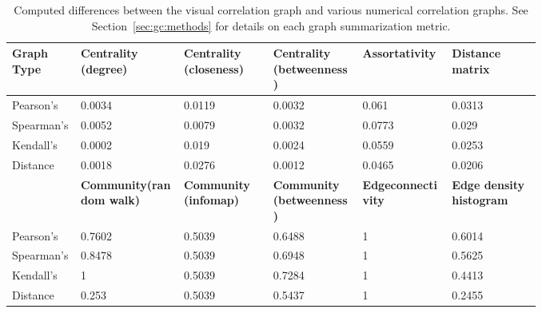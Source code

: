 \begin{landscape}
	\tablespacing
	\begin{longtable}{p{0.1\linewidth}p{0.15\linewidth}p{0.13\linewidth}
			p{0.13\linewidth}p{0.13\linewidth}p{0.13\linewidth} }
		
		\caption[Computed differences between the visual correlation graph and 
		various numerical correlation graphs.]{Computed differences between the 
		visual correlation graph and various numerical correlation graphs. See 
		Section~\ref{sec:gc:methods} for details on each graph summarization 
		metric.} 
		\label{tab:usage:graphdiff}\\
		\toprule
		\textbf{Graph Type} & \textbf{Centrality \newline (degree)} & 
		\textbf{Centrality \newline (closeness)} & 
		\textbf{Centrality \newline (betweenness)} & 
		\textbf{Assortativity} & \textbf{Distance \newline matrix} \\
		\midrule
		\endfirsthead
		
		\bottomrule
		\endlastfoot

		Pearson's & 0.0034 & 0.0119 & 0.0032 & 0.061 & 0.0313\\
		
		Spearman's & 0.0052 & 0.0079 & 0.0032 & 0.0773 & 0.029\\
		
		Kendall's & 0.0002 & 0.019 & 0.0024 & 0.0559 & 0.0253\\
		
		Distance & 0.0018 & 0.0276 & 0.0012 & 0.0465 & 0.0206\\
		
		\midrule
		
		& \textbf{Community\newline (random walk)} & 
		\textbf{Community \newline (infomap)} & 
		\textbf{Community \newline (betweenness)} & 
		\textbf{Edge\newline connectivity} & 
		\textbf{Edge density \newline histogram} \\
		 	
		\midrule
		
		Pearson's & 0.7602 & 0.5039 & 0.6488 & 1 & 0.6014\\
		
		Spearman's & 0.8478 & 0.5039 & 0.6948 & 1 & 0.5625\\
		
		Kendall's & 1 & 0.5039 & 0.7284 & 1 & 0.4413\\
		
		Distance & 0.253 & 0.5039 & 0.5437 & 1 & 0.2455\\
		
	\end{longtable}
	\bodyspacing
\end{landscape}





